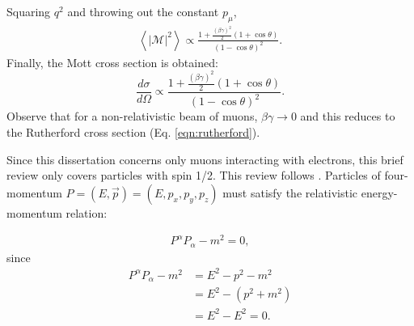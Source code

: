 Squaring $q^2$ and throwing out the constant $p_\mu$,
\begin{align*}
\left< |\mathcal{M}|^2\right> \propto \frac{1+\frac{(\beta\gamma)^2}{2} (1+\cos\theta)  }{(1-\cos\theta)^2}.
\end{align*}
Finally, the Mott cross section is obtained:
\begin{equation}\label{eqn:MottCrossSection_apx}
\frac{d\sigma}{d\Omega} \propto \frac{1+\frac{(\beta\gamma)^2}{2} (1+\cos\theta)  }{(1-\cos\theta)^2}.
\end{equation}
Observe that for a non-relativistic beam of muons, $\beta\gamma \rightarrow 0$ and this reduces to the Rutherford cross section (Eq. \eqref{eqn:rutherford}).
 \label{apx:particlePhysicsReview}

Since this dissertation concerns only muons interacting with electrons, this
brief review only covers particles with spin 1/2. This review follows
\cite{griffithspp}.
Particles of four-momentum $P=(E, \vec{p})=(E,p_x,p_y,p_z)$ must satisfy the
relativistic
energy-momentum relation:

\begin{gather} \label{eqn:energyMomentumRelation}
P^{\alpha}P_\alpha - m^2 = 0,
\end{gather}
since
\begin{align*}
P^{\alpha}P_\alpha - m^2&=E^2-p^2-m^2 \\ &=E^2-(p^2+m^2) \\ &=E^2-E^2=0.
\end{align*}

